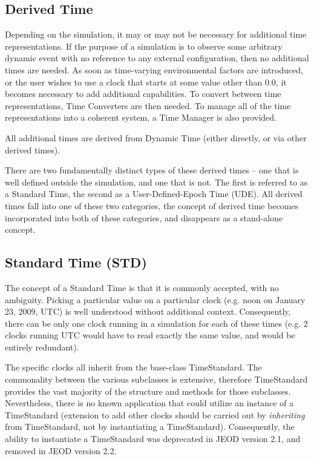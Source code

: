 \subsection{Derived Time}
Depending on the simulation, it may or may not be necessary for
additional time representations.  If the purpose of a simulation is to
observe some arbitrary dynamic event with no reference to any external
configuration, then no additional times are needed.  As soon as
time-varying environmental factors are introduced, or the user wishes
to use a clock that starts at some value other than 0.0, it becomes
necessary to add additional capabilities.  To convert between time
representations, Time Converters are then needed.  To manage all of the
time representations into a coherent system, a Time Manager is also
provided.

All additional times are derived from Dynamic Time (either directly, or
via other derived times).  

There are two fundamentally distinct types of these derived times -- one
that is well defined outside the simulation, and one that is not.  The
first is referred to as a Standard Time, the second as a
User-Defined-Epoch Time (UDE).  All derived times fall into one of
these two categories, the concept of derived time becomes incorporated
into both of these categories, and disappears as a stand-alone concept.

\subsection[Standard Time (STD)]{Standard Time (STD)}
The concept of a Standard Time is that it is commonly accepted, with no
ambiguity.  Picking a particular value on a particular clock (e.g. noon
on January 23, 2009, UTC) is well understood without additional
context.  Consequently, there can be only one clock running in a
simulation for each of these times (e.g. 2 clocks running UTC would
have to read exactly the same value, and would be entirely redundant).

The specific clocks all inherit from the base-class TimeStandard.  The 
commonality between the various subclasses is extensive, therefore TimeStandard
provides the vast majority of the structure and methods for those subclasses.
Nevertheless, there is no known application that could utilize an
instance of a TimeStandard (extension to add other clocks should be carried out
by \textit{inheriting} from TimeStandard, not by instantiating a TimeStandard).  
Consequently, the ability to instantiate a TimeStandard was deprecated in JEOD 
version 2.1, and removed in JEOD version 2.2.

